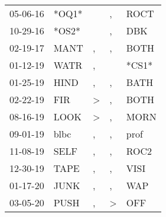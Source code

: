 \begin{supertabular}{lllll}
 05-06-16 &  *OQ1* &               &             , &   ROCT \\
 10-29-16 &  *OS2* &               &             , &    DBK \\
 02-19-17 &   MANT &             , &             , &   BOTH \\
 01-12-19 &   WATR &             , &               &  *CS1* \\
 01-25-19 &   HIND &             , &             , &   BATH \\
 02-22-19 &    FIR &  \textgreater &             , &   BOTH \\
 08-16-19 &   LOOK &  \textgreater &             , &   MORN \\
 09-01-19 &   blbc &             , &             , &   prof \\
 11-08-19 &   SELF &             , &             , &   ROC2 \\
 12-30-19 &   TAPE &             , &             , &   VISI \\
 01-17-20 &   JUNK &             , &             , &    WAP \\
 03-05-20 &   PUSH &             , &  \textgreater &    OFF \\
\end{supertabular}
